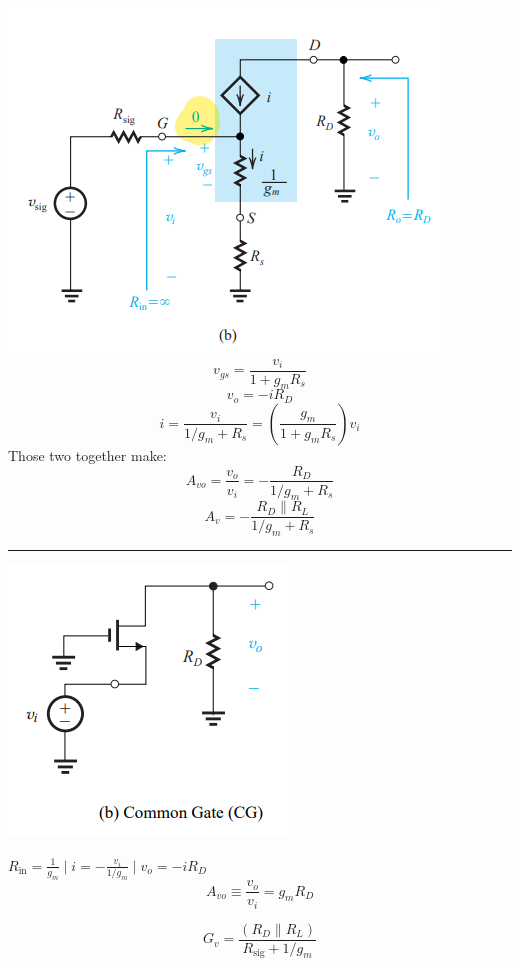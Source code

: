 \documentclass[a4paper]{article}
\begin{document}
\begin{multicols*}{3}
\includegraphics[width=\linewidth]{imgs/cs_rs.png}
$$v_{gs}=\frac{v_i}{1+g_mR_s}$$
$$v_o=-i R_D$$
$$i = \frac{v_i}{1/g_m + R_s} = \left(\frac{g_m}{1+g_m R_s}\right)v_i$$
Those two together make:
$$A_{vo}=\frac{v_o}{v_i} = -\frac{R_D}{1/g_m + R_s}$$
$$A_v=-\frac{R_D \parallel R_L}{1/g_m + R_s}$$

\hrule
\includegraphics[width=0.8\linewidth]{imgs/common_gate.png}

$R_\text{in}=\frac{1}{g_m} \mid i=-\frac{v_i}{1/g_m} \mid v_o=-i R_D$\\
$$A_{vo} \equiv \frac{v_o}{v_i} = g_m R_D$$

$$G_v= \frac{(R_D \parallel R_L)}{R_\text{sig}+1/ g_m}$$


\end{multicols*}
\end{document}
